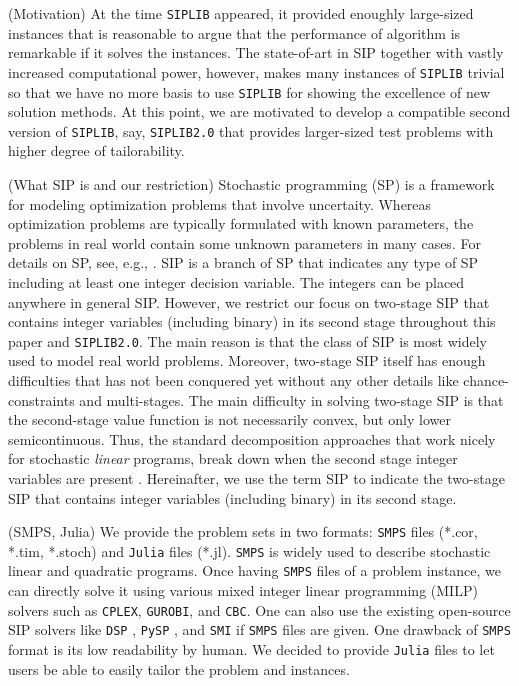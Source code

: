 (Motivation) At the time \texttt{SIPLIB} appeared, it provided enoughly large-sized instances that is reasonable to argue that the performance of algorithm is remarkable if it solves the instances. The state-of-art in SIP together with vastly increased computational power, however, makes many instances of \texttt{SIPLIB} trivial so that we have no more basis to use \texttt{SIPLIB} for showing the excellence of new solution methods. At this point, we are motivated to develop a compatible second version of \texttt{SIPLIB}, say, \texttt{SIPLIB2.0} that provides larger-sized test problems with higher degree of tailorability.

(What SIP is and our restriction) Stochastic programming (SP) is a framework for modeling optimization problems that involve uncertaity. Whereas optimization problems are typically formulated with known parameters, the problems in real world contain some unknown parameters in many cases. For details on SP, see, e.g., \cite{web:SPS,book:BL2011}. SIP is a branch of SP that indicates any type of SP including at least one integer decision variable. The integers can be placed anywhere in general SIP. However, we restrict our focus on two-stage SIP that contains integer variables (including binary) in its second stage throughout this paper and \texttt{SIPLIB2.0}. The main reason is that the class of SIP is most widely used to model real world problems. Moreover, two-stage SIP itself has enough difficulties that has not been conquered yet without any other details like chance-constraints and multi-stages. The main difficulty in solving two-stage SIP is that the second-stage value function is not necessarily convex, but only lower semicontinuous. Thus, the standard decomposition approaches that work nicely for stochastic \textit{linear} programs, break down when the second stage integer variables are present \cite{journal:AG2003}. Hereinafter, we use the term SIP to indicate the two-stage SIP that contains integer variables (including binary) in its second stage.

(SMPS, Julia)
We provide the problem sets in two formats: \texttt{SMPS} files (*.cor, *.tim, *.stoch) and \texttt{Julia} files (*.jl). \texttt{SMPS} is widely used to describe stochastic linear and quadratic programs. Once having \texttt{SMPS} files of a problem instance, we can directly solve it using various mixed integer linear programming (MILP) solvers such as \texttt{CPLEX}, \texttt{GUROBI}, and \texttt{CBC}. One can also use the existing open-source SIP solvers like \texttt{DSP} \cite{journal:KZ2015}, \texttt{PySP} \cite{journal:WWH2012}, and \texttt{SMI} \cite{web:SMI} if \texttt{SMPS} files are given. One drawback of \texttt{SMPS} format is its low readability by human. We decided to provide \texttt{Julia} files to let users be able to easily tailor the problem and instances.

